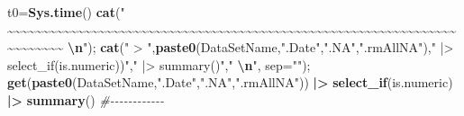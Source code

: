 \documentclass[
]{article}
\newenvironment{Shaded}{\begin{snugshade}}{\end{snugshade}}
\newcommand{\AttributeTok}[1]{\textcolor[rgb]{0.13,0.29,0.53}{#1}}
\newcommand{\CommentTok}[1]{\textcolor[rgb]{0.56,0.35,0.01}{\textit{#1}}}
\newcommand{\FunctionTok}[1]{\textcolor[rgb]{0.13,0.29,0.53}{\textbf{#1}}}
\newcommand{\NormalTok}[1]{#1}
\newcommand{\OtherTok}[1]{\textcolor[rgb]{0.56,0.35,0.01}{#1}}
\newcommand{\SpecialCharTok}[1]{\textcolor[rgb]{0.81,0.36,0.00}{\textbf{#1}}}
\newcommand{\StringTok}[1]{\textcolor[rgb]{0.31,0.60,0.02}{#1}}
\begin{document}
\begin{Shaded}
\begin{Highlighting}[]
  
\NormalTok{t0}\OtherTok{=}\FunctionTok{Sys.time}\NormalTok{()}
\FunctionTok{cat}\NormalTok{(}\StringTok{"    \textasciitilde{}\textasciitilde{}\textasciitilde{}\textasciitilde{}\textasciitilde{}\textasciitilde{}\textasciitilde{}\textasciitilde{}\textasciitilde{}\textasciitilde{}\textasciitilde{}\textasciitilde{}\textasciitilde{}\textasciitilde{}\textasciitilde{}\textasciitilde{}\textasciitilde{}\textasciitilde{}\textasciitilde{}\textasciitilde{}\textasciitilde{}\textasciitilde{}\textasciitilde{}\textasciitilde{}\textasciitilde{}\textasciitilde{}\textasciitilde{}\textasciitilde{}\textasciitilde{}\textasciitilde{}\textasciitilde{}\textasciitilde{}\textasciitilde{}\textasciitilde{}\textasciitilde{}\textasciitilde{}\textasciitilde{}\textasciitilde{}\textasciitilde{}\textasciitilde{}\textasciitilde{}\textasciitilde{}\textasciitilde{}\textasciitilde{}\textasciitilde{}\textasciitilde{}\textasciitilde{}\textasciitilde{}\textasciitilde{}\textasciitilde{}\textasciitilde{}\textasciitilde{}\textasciitilde{}\textasciitilde{}\textasciitilde{}\textasciitilde{}\textasciitilde{}\textasciitilde{}\textasciitilde{}\textasciitilde{}\textasciitilde{}\textasciitilde{}\textasciitilde{}\textasciitilde{}\textasciitilde{}\textasciitilde{}\textasciitilde{}\textasciitilde{}\textasciitilde{}\textasciitilde{}\textasciitilde{}\textasciitilde{}    }\SpecialCharTok{\textbackslash{}n}\StringTok{"}\NormalTok{); }\FunctionTok{cat}\NormalTok{(}\StringTok{" \textgreater{} "}\NormalTok{,}\FunctionTok{paste0}\NormalTok{(DataSetName,}\StringTok{".Date"}\NormalTok{,}\StringTok{".NA"}\NormalTok{,}\StringTok{".rmAllNA"}\NormalTok{),}\StringTok{" |\textgreater{} select\_if(is.numeric))"}\NormalTok{,}\StringTok{" |\textgreater{} summary()"}\NormalTok{,}\StringTok{"  }\SpecialCharTok{\textbackslash{}n}\StringTok{"}\NormalTok{, }\AttributeTok{sep=}\StringTok{""}\NormalTok{); }\FunctionTok{get}\NormalTok{(}\FunctionTok{paste0}\NormalTok{(DataSetName,}\StringTok{".Date"}\NormalTok{,}\StringTok{".NA"}\NormalTok{,}\StringTok{".rmAllNA"}\NormalTok{)) }\SpecialCharTok{|\textgreater{}} \FunctionTok{select\_if}\NormalTok{(is.numeric) }\SpecialCharTok{|\textgreater{}} \FunctionTok{summary}\NormalTok{() }\CommentTok{\#{-}{-}{-}{-}{-}{-}{-}{-}{-}{-}{-}{-}  }

\end{Highlighting}
\end{Shaded}
\end{document}
